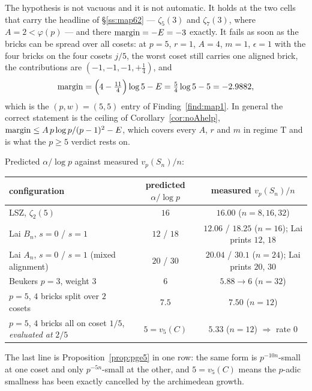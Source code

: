 \begin{remark}\label{rem:pge5sharp}
 The hypothesis is not vacuous and it is not automatic. It holds at the
two cells that carry the headline of \S\ref{ss:map62} --- $\zeta_5(3)$ and $\zeta_7(3)$,
where $A=2<\varphi(p)$ --- and there $\operatorname{margin}=-E=-3$ exactly. It fails as soon as the bricks
can be spread over all cosets: at $p=5$, $r=1$, $A=4$, $m=1$, $\epsilon=1$ with the four
bricks on the four cosets $j/5$, the worst coset still carries one aligned brick, the
contributions are $(-1,-1,-1,+\tfrac14)$, and
\[
 \operatorname{margin}=\Bigl(4-\tfrac{11}4\Bigr)\log5-E=\tfrac54\log5-5=-2.9882 ,
\]
which is the $(p,w)=(5,5)$ entry of Finding~\ref{find:map1}. In general the correct
statement is the ceiling of Corollary~\ref{cor:noAhelp}, $\operatorname{margin}\le A\,p\log p/(p-1)^2-E$,
which covers every $A$, $r$ and $m$ in regime T and is what the $p\ge5$ verdict rests on.
\end{remark}

\begin{finding}\label{find:alignvisible}
 Predicted $\alpha/\log p$ against
measured $v_p(S_n)/n$:
\begin{center}
\tabsmall
\begin{tabular}{lcc}
\toprule
configuration & predicted $\alpha/\log p$ & measured $v_p(S_n)/n$\\
\midrule
LSZ, $\zeta_2(5)$ & $16$ & $16.00$ ($n=8,16,32$)\\
Lai $B_n$, $s=0$ / $s=1$ & $12$ / $18$ & $12.06$ / $18.25$ ($n=16$); Lai prints $12$, $18$\\
Lai $A_n$, $s=0$ / $s=1$ (mixed alignment) & $20$ / $30$ & $20.04$ / $30.1$ ($n=24$); Lai prints $20$, $30$\\
Beukers $p=3$, weight $3$ & $6$ & $5.88\to6$ ($n=32$)\\
$p=5$, $4$ bricks split over $2$ cosets & $7.5$ & $7.50$ ($n=12$)\\
$p=5$, $4$ bricks all on coset $1/5$, \emph{evaluated at} $2/5$ & $5=v_5(C)$ & $5.33$ ($n=12$) $\Rightarrow$ rate $0$\\
\bottomrule
\end{tabular}
\end{center}
The last line is Proposition~\ref{prop:pge5} in one row: the same form is $p^{-10n}$-small
at one coset and only $p^{-5n}$-small at the other, and $5=v_5(C)$ means the $p$-adic
smallness has been exactly cancelled by the archimedean growth.
\end{finding}

